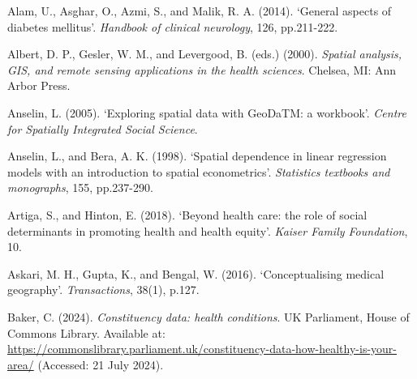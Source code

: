 {}

\begin{Reference}
\begin{flushleft}
Alam, U., Asghar, O., Azmi, S., and Malik, R. A. (2014). `General aspects of diabetes mellitus'. \textit{Handbook of clinical neurology}, 126, pp.211-222.
\end{flushleft}
\vspace{2pt}


\begin{flushleft}
Albert, D. P., Gesler, W. M., and Levergood, B. (eds.) (2000). \textit{Spatial analysis, GIS, and remote sensing applications in the health sciences}. Chelsea, MI: Ann Arbor Press.
\end{flushleft}
\vspace{2pt}


\begin{flushleft}
Anselin, L. (2005). `Exploring spatial data with GeoDaTM: a workbook'. \textit{Centre for Spatially Integrated Social Science}.
\end{flushleft}
\vspace{2pt}


\begin{flushleft}
Anselin, L., and Bera, A. K. (1998). `Spatial dependence in linear regression models with an introduction to spatial econometrics'. \textit{Statistics textbooks and monographs}, 155, pp.237-290.
\end{flushleft}
\vspace{2pt}


\begin{flushleft}
Artiga, S., and Hinton, E. (2018). `Beyond health care: the role of social determinants in promoting health and health equity'. \textit{Kaiser Family Foundation}, 10.
\end{flushleft}
\vspace{2pt}


\begin{flushleft}
Askari, M. H., Gupta, K., and Bengal, W. (2016). `Conceptualising medical geography'. \textit{Transactions}, 38(1), p.127.
\end{flushleft}
\vspace{2pt}


\begin{flushleft}
Baker, C. (2024). \textit{Constituency data: health conditions}. UK Parliament, House of Commons Library. Available at: \url{https://commonslibrary.parliament.uk/constituency-data-how-healthy-is-your-area/} (Accessed: 21 July 2024).
\end{flushleft}
\vspace{7pt}



\end{Reference}
